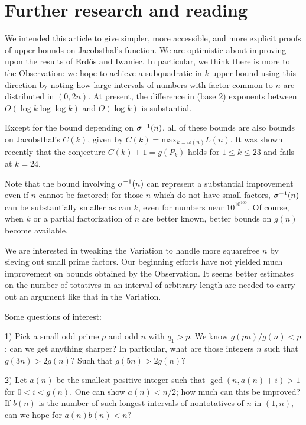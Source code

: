 \documentclass[12pt,leqno]{article}
\begin{document}
\section{Further research and reading}

We intended this article to give simpler, more accessible, and more explicit proofs of upper
bounds on Jacobsthal's function.  We are optimistic about improving upon the
 results of Erd\H{o}s and Iwaniec.  In particular, we think there is more to the Observation:
we hope to achieve a subquadratic in $k$ upper bound using this direction by noting how large
intervals of numbers with  factor common to $n$ are distributed in $(0, 2n)$.  At present,
the difference in (base 2) exponents between $O(\log k\log\log k)$ and $O(\log k)$ is substantial.

Except for the bound depending on ${\sigma}^{-1}(n)$, all of these bounds are also bounds on
Jacobsthal's $C(k)$, given by $C(k) =\textrm{max}_{k=\omega(n)} L(n)$. It was shown recently 
\cite{HS} that
the conjecture $C(k) + 1 =g(P_k)$ holds for $1 \leq k \leq 23$ and fails at $k=24$.

Note that the bound involving ${\sigma}^{-1}(n)$ can represent a substantial improvement even
if $n$ cannot be factored; for those $n$ which do not have small factors, ${\sigma}^{-1}(n)$
can be substantially smaller as can $k$, even for numbers near $10^{10^{100}}$.  Of course,
when $k$ or a partial factorization of $n$ are better known, better bounds on $g(n)$
become available.

We are interested in tweaking the Variation to handle more squarefree $n$ 
by sieving out small prime factors.  Our beginning efforts have not yielded
much improvement on bounds obtained by the Observation.  It seems better
estimates on the number of totatives in an interval of arbitrary length are
needed to carry out an argument like that in the Variation.

Some questions of interest:

1) Pick a small odd prime $p$ and odd $n$ with $q_1 \gt p$.  We know $g(pn)/g(n) \lt p$: can we
get anything sharper?  In particular, what are those integers $n$ such that 
$g(3n) \gt 2g(n)?$  Such that $g(5n) \gt 2g(n)?$

2) Let $a(n)$ be the smallest positive integer such that $\gcd(n, a(n) + i) \gt 1$ for 
$0 \lt i \lt g(n)$.  One can show $a(n) \lt n/2$; how much can this be improved?  If $b(n)$
is the number of such longest intervals of nontotatives of $n$ in $(1,n)$, can we hope
for $a(n)b(n) \lt n$?
\end{document}
